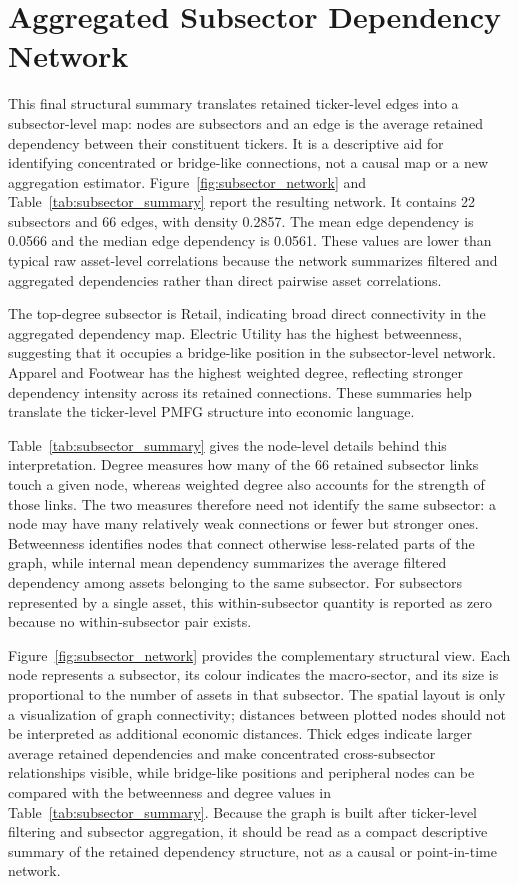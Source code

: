 \section{Aggregated Subsector Dependency Network}
\label{sec:subsector_network}

This final structural summary translates retained ticker-level edges into a subsector-level map: nodes are subsectors and an edge is the average retained dependency between their constituent tickers. It is a descriptive aid for identifying concentrated or bridge-like connections, not a causal map or a new aggregation estimator. Figure~\ref{fig:subsector_network} and Table~\ref{tab:subsector_summary} report the resulting network. It contains 22 subsectors and 66 edges, with density 0.2857. The mean edge dependency is 0.0566 and the median edge dependency is 0.0561. These values are lower than typical raw asset-level correlations because the network summarizes filtered and aggregated dependencies rather than direct pairwise asset correlations.

The top-degree subsector is Retail, indicating broad direct connectivity in the aggregated dependency map. Electric Utility has the highest betweenness, suggesting that it occupies a bridge-like position in the subsector-level network. Apparel and Footwear has the highest weighted degree, reflecting stronger dependency intensity across its retained connections. These summaries help translate the ticker-level PMFG structure into economic language.

Table~\ref{tab:subsector_summary} gives the node-level details behind this interpretation. Degree measures how many of the 66 retained subsector links touch a given node, whereas weighted degree also accounts for the strength of those links. The two measures therefore need not identify the same subsector: a node may have many relatively weak connections or fewer but stronger ones. Betweenness identifies nodes that connect otherwise less-related parts of the graph, while internal mean dependency summarizes the average filtered dependency among assets belonging to the same subsector. For subsectors represented by a single asset, this within-subsector quantity is reported as zero because no within-subsector pair exists.

Figure~\ref{fig:subsector_network} provides the complementary structural view. Each node represents a subsector, its colour indicates the macro-sector, and its size is proportional to the number of assets in that subsector. The spatial layout is only a visualization of graph connectivity; distances between plotted nodes should not be interpreted as additional economic distances. Thick edges indicate larger average retained dependencies and make concentrated cross-subsector relationships visible, while bridge-like positions and peripheral nodes can be compared with the betweenness and degree values in Table~\ref{tab:subsector_summary}. Because the graph is built after ticker-level filtering and subsector aggregation, it should be read as a compact descriptive summary of the retained dependency structure, not as a causal or point-in-time network.

